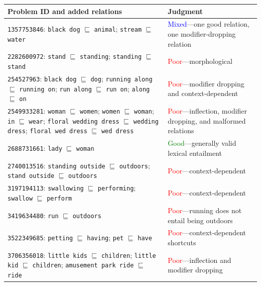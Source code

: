 \begin{table}[t]
\centering
\small
\setlength{\tabcolsep}{4pt}
\begin{tabularx}{\textwidth}{@{}p{}p{}@{}}
\everycr{\noalign{\smallskip\midrule}}
\toprule
Problem ID and added relations & Judgment \\
\midrule
\texttt{1357753846}: \texttt{black dog} $\sqsubseteq$ \texttt{animal}; \texttt{stream} $\sqsubseteq$ \texttt{water} & \textcolor{blue}{Mixed}---one good relation, one modifier-dropping relation \\
\texttt{2282600972}: \texttt{stand} $\sqsubseteq$ \texttt{standing}; \texttt{standing} $\sqsubseteq$ \texttt{stand} & \textcolor{red}{Poor}---morphological \\
\texttt{254527963}: \texttt{black dog} $\sqsubseteq$ \texttt{dog}; \texttt{running along} $\sqsubseteq$ \texttt{running on}; \texttt{run along} $\sqsubseteq$ \texttt{run on}; \texttt{along} $\sqsubseteq$ \texttt{on} & \textcolor{red}{Poor}---modifier dropping and context-dependent \\
\texttt{2549933281}: \texttt{woman} $\sqsubseteq$ \texttt{women}; \texttt{women} $\sqsubseteq$ \texttt{woman}; \texttt{in} $\sqsubseteq$ \texttt{wear}; \texttt{floral wedding dress} $\sqsubseteq$ \texttt{wedding dress}; \texttt{floral wed dress} $\sqsubseteq$ \texttt{wed dress} & \textcolor{red}{Poor}---inflection, modifier dropping, and malformed relations \\
\texttt{2688731661}: \texttt{lady} $\sqsubseteq$ \texttt{woman} & \textcolor{green}{Good}---generally valid lexical entailment \\
\texttt{2740013516}: \texttt{standing outside} $\sqsubseteq$ \texttt{outdoors}; \texttt{stand outside} $\sqsubseteq$ \texttt{outdoors} & \textcolor{red}{Poor}---context-dependent \\
\texttt{3197194113}: \texttt{swallowing} $\sqsubseteq$ \texttt{performing}; \texttt{swallow} $\sqsubseteq$ \texttt{perform} & \textcolor{red}{Poor}---context-dependent \\
\texttt{3419634480}: \texttt{run} $\sqsubseteq$ \texttt{outdoors} & \textcolor{red}{Poor}---running does not entail being outdoors \\
\texttt{3522349685}: \texttt{petting} $\sqsubseteq$ \texttt{having}; \texttt{pet} $\sqsubseteq$ \texttt{have} & \textcolor{red}{Poor}---context-dependent shortcuts \\
\texttt{3706356018}: \texttt{little kids} $\sqsubseteq$ \texttt{children}; \texttt{little kid} $\sqsubseteq$ \texttt{children}; \texttt{amusement park ride} $\sqsubseteq$ \texttt{ride} & \textcolor{red}{Poor}---inflection and modifier dropping \\

\end{tabularx}
\end{table}
